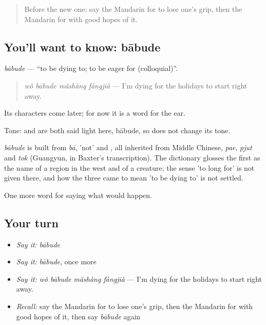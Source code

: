 \label{lesson:ZH-C532-babude}



\begin{quote}
Before the new one: say the Mandarin for to lose one's grip, then the Mandarin for with good hopes of it.
\end{quote}

\subsection*{You'll want to know: bābude}
\emph{bābude} — \textquotedblleft{}to be dying to; to be eager for (colloquial)\textquotedblright{}.

\begin{quote}
\emph{wǒ bābude mǎshàng fàngjià} — I'm dying for the holidays to start right away.
\end{quote}

Its characters come later; for now it is a word for the ear.

Tone:  and  are both said light here, bābude, so  does not change its tone.

\begin{cousinweb}
\emph{bābude} is built from \emph{bā},  'not' and , all inherited from Middle Chinese, \emph{pae}, \emph{pjut} and \emph{tok} (Guangyun, in Baxter's transcription). The dictionary glosses the first as the name of a region in the west and of a creature; the sense 'to long for' is not given there, and how the three came to mean 'to be dying to' is not settled.
\end{cousinweb}

\begin{grammarlens}[title={What you've built}]
One more word for saying what would happen.
\end{grammarlens}

\subsection*{Your turn}
\begin{itemize}
\raggedright
  \item \emph{Say it:} \emph{bābude}
  \item \emph{Say it:} \emph{bābude}, once more
  \item \emph{Say it:} \emph{wǒ bābude mǎshàng fàngjià} — I'm dying for the holidays to start right away.
  \item \emph{Recall:} say the Mandarin for to lose one's grip, then the Mandarin for with good hopes of it, then say \emph{bābude} again
\end{itemize}

